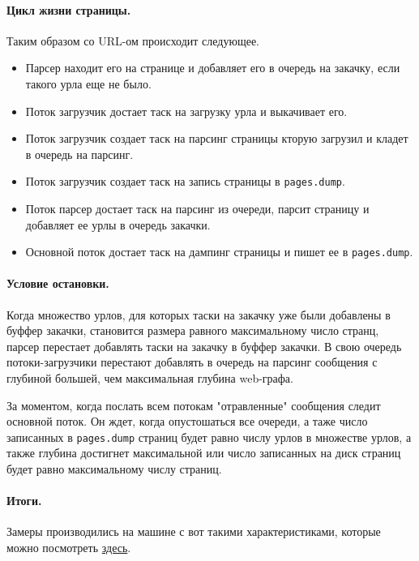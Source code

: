 \documentclass[12pt]{article}
\begin{document}
\paragraph{Цикл жизни страницы.}
Таким образом со URL-ом происходит следующее.
\begin{itemize}
    \item Парсер находит его на странице и добавляет его в очередь на закачку, если
          такого урла еще не было.
    \item Поток загрузчик достает таск на загрузку урла и выкачивает его.
    \item Поток загрузчик создает таск на парсинг страницы кторую загрузил и кладет
          в очередь на парсинг.
    \item Поток загрузчик создает таск на запись страницы в \verb|pages.dump|.
    \item Поток парсер достает таск на парсинг из очереди, парсит страницу и добавляет
          ее урлы в очередь закачки.
    \item Основной поток достает таск на дампинг страницы и пишет ее в \verb|pages.dump|.
\end{itemize}

\paragraph{Условие остановки.}
Когда множество урлов, для которых таски на закачку уже были добавлены в буффер закачки,
становится размера равного максимальному число странц, парсер перестает добавлять
таски на закачку в буффер закачки.
В свою очередь потоки-загрузчики перестают добавлять в очередь на парсинг сообщения
с глубиной большей, чем максимальная глубина web-графа.

За моментом, когда послать всем потокам "отравленные" сообщения следит основной поток.
Он ждет, когда опустошаться все очереди, а таже число записанных в \verb|pages.dump|
страниц будет равно числу урлов в множестве урлов, а также глубина достигнет максимальной
или число записанных на диск страниц будет равно максимальному числу страниц.

\paragraph{Итоги.}
Замеры производились на машине с вот такими характеристиками, которые можно
посмотреть \href{http://market.yandex.ru/model-spec.xml?CMD=-RR=9,0,0,0-PF=1801946~EQ~sel~1871523-PF=2142398356~EQ~sel~535392919-PF=1801946~EQ~sel~1871523-PF=2142398356~EQ~sel~535392919-PF=2142398543~EQ~sel~x1670617603-PF=2142398534~LT~sel~15.41-PF=2142398534~GT~sel~13.03-PF=2142398506~TR~sel~select-VIS=478-CAT_ID=432460-BPOS=10-EXC=1-PG=10&modelid=6297228&hid=91013}{здесь}.
\end{document}
